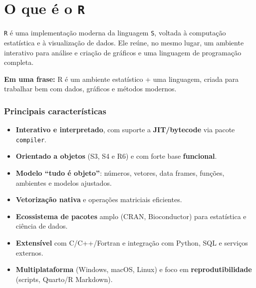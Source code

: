 \documentclass[
  letterpaper,
  DIV=11,
  numbers=noendperiod]{scrreprt}
\begin{document}
\section{\texorpdfstring{O que é o
\texttt{R}}{O que é o R}}\label{o-que-uxe9-o-r}

\texttt{R} é uma implementação moderna da linguagem \texttt{S}, voltada
à computação estatística e à visualização de dados. Ele reúne, no mesmo
lugar, um ambiente interativo para análise e criação de gráficos e uma
linguagem de programação completa.

\begin{tcolorbox}[enhanced jigsaw, left=2mm, toprule=.15mm, opacityback=0, title=\textcolor{quarto-callout-note-color}{\faInfo}\hspace{0.5em}{Nota}, leftrule=.75mm, breakable, colbacktitle=quarto-callout-note-color!10!white, coltitle=black, rightrule=.15mm, bottomtitle=1mm, toptitle=1mm, colframe=quarto-callout-note-color-frame, colback=white, opacitybacktitle=0.6, bottomrule=.15mm, arc=.35mm, titlerule=0mm]

\textbf{Em uma frase:} R é um ambiente estatístico + uma linguagem,
criada para trabalhar bem com dados, gráficos e métodos modernos.

\end{tcolorbox}

\subsubsection*{Principais
características}\label{principais-caracteruxedsticas}

\begin{itemize}
\item
  \textbf{Interativo e interpretado}, com suporte a
  \textbf{JIT/bytecode} via pacote \texttt{compiler}.
\item
  \textbf{Orientado a objetos} (S3, S4 e R6) e com forte base
  \textbf{funcional}.
\item
  \textbf{Modelo ``tudo é objeto''}: números, vetores, data frames,
  funções, ambientes e modelos ajustados.
\item
  \textbf{Vetorização nativa} e operações matriciais eficientes.
\item
  \textbf{Ecossistema de pacotes} amplo (CRAN, Bioconductor) para
  estatística e ciência de dados.
\item
  \textbf{Extensível} com C/C++/Fortran e integração com Python, SQL e
  serviços externos.
\item
  \textbf{Multiplataforma} (Windows, macOS, Linux) e foco em
  \textbf{reprodutibilidade} (scripts, Quarto/R Markdown).
\end{itemize}
\end{document}
